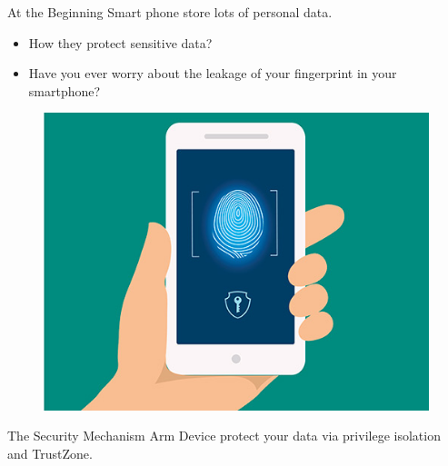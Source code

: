 \documentclass{beamer}
\begin{document}
\begin{frame}{At the Beginning}
    Smart phone store lots of personal data. 
    \begin{itemize}
        \item How they protect sensitive data?
        \item Have you ever worry about the leakage of your fingerprint in your smartphone?
    \end{itemize}
    \begin{figure}
        \centering
        \includegraphics[scale=.30]{SUSTech-Beamer-Theme/pic/smartphone-security.jpg}
        \label{fig:my_label}
    \end{figure}
\end{frame}

\begin{frame}{The Security Mechanism}
    Arm Device protect your data via privilege isolation and TrustZone.
\end{frame}
\end{document}
